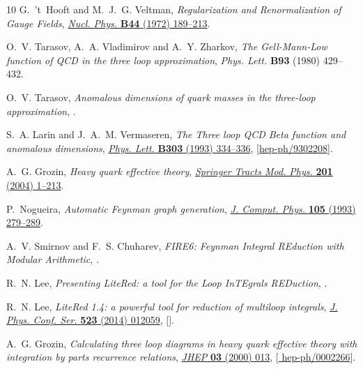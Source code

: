 \documentclass[12pt]{article}
\numberwithin{equation}{section}
\newcommand{\1}[1]{\mathbf{1}^{#1}}
\newcommand{\2}[1]{\mathbf{2}^{#1}}
\newcommand{\3}[1]{\mathbf{3}^{#1}}
\newcommand{\4}[1]{\mathbf{4}^{#1}}
\newcommand{\5}[1]{\mathbf{5}^{#1}}
\begin{document}
\begin{thebibliography}{10}
G.~'t~Hooft and M.~J.~G. Veltman, \emph{{Regularization and Renormalization of
  Gauge Fields}},
  \href{http://dx.doi.org/10.1016/0550-3213(72)90279-9}{\emph{Nucl. Phys.}
  {\bfseries B44} (1972) 189--213}.

O.~V. Tarasov, A.~A. Vladimirov and A.~Y. Zharkov, \emph{{The Gell-Mann-Low
  function of QCD in the three loop approximation}}, {\emph{Phys. Lett.}
  {\bfseries B93} (1980) 429--432}.

O.~V. Tarasov, \emph{{Anomalous dimensions of quark masses in the three-loop
  approximation}},  \href{https://arxiv.org/abs/1910.12231}{{}}.

S.~A. Larin and J.~A.~M. Vermaseren, \emph{{The Three loop QCD Beta function
  and anomalous dimensions}},
  \href{http://dx.doi.org/10.1016/0370-2693(93)91441-O}{\emph{Phys. Lett.}
  {\bfseries B303} (1993) 334--336},
  [\href{https://arxiv.org/abs/hep-ph/9302208}{{\ttfamily hep-ph/9302208}}].

A.~G. Grozin, \emph{{Heavy quark effective theory}},
  \href{http://dx.doi.org/10.1007/b79301}{\emph{Springer Tracts Mod. Phys.}
  {\bfseries 201} (2004) 1--213}.

P.~Nogueira, \emph{{Automatic Feynman graph generation}},
  \href{http://dx.doi.org/10.1006/jcph.1993.1074}{\emph{J. Comput. Phys.}
  {\bfseries 105} (1993) 279--289}.

A.~V. Smirnov and F.~S. Chuharev, \emph{{FIRE6: Feynman Integral REduction with
  Modular Arithmetic}},  \href{https://arxiv.org/abs/1901.07808}{{}}.

R.~N. Lee, \emph{{Presenting LiteRed: a tool for the Loop InTEgrals
  REDuction}},  \href{https://arxiv.org/abs/1212.2685}{{}}.

R.~N. Lee, \emph{{LiteRed 1.4: a powerful tool for reduction of multiloop
  integrals}}, \href{http://dx.doi.org/10.1088/1742-6596/523/1/012059}{\emph{J.
  Phys. Conf. Ser.} {\bfseries 523} (2014) 012059},
  [\href{https://arxiv.org/abs/1310.1145}{{}}].

A.~G. Grozin, \emph{{Calculating three loop diagrams in heavy quark effective
  theory with integration by parts recurrence relations}},
  \href{http://dx.doi.org/10.1088/1126-6708/2000/03/013}{\emph{JHEP} {\bfseries
  03} (2000) 013}, [\href{https://arxiv.org/abs/hep-ph/0002266}{{\ttfamily
  hep-ph/0002266}}].


\end{thebibliography}
\end{document}
